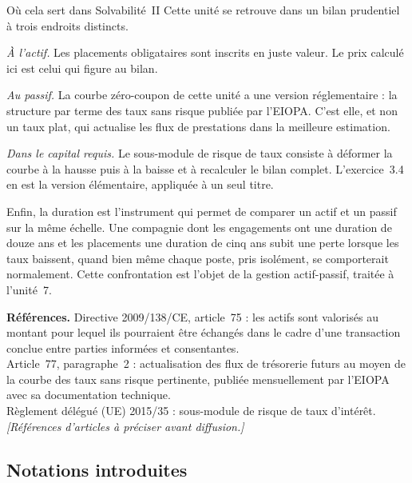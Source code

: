 \begin{pont}{Où cela sert dans Solvabilité~II}
Cette unité se retrouve dans un bilan prudentiel à trois endroits distincts.

\medskip
\emph{À l'actif.} Les placements obligataires sont inscrits en juste valeur.
Le prix calculé ici est celui qui figure au bilan.

\emph{Au passif.} La courbe zéro-coupon de cette unité a une version
réglementaire : la structure par terme des taux sans risque publiée par l'EIOPA.
C'est elle, et non un taux plat, qui actualise les flux de prestations dans la
meilleure estimation.

\emph{Dans le capital requis.} Le sous-module de risque de taux consiste à
déformer la courbe à la hausse puis à la baisse et à recalculer le bilan complet.
L'exercice~3.4 en est la version élémentaire, appliquée à un seul titre.

\medskip
Enfin, la duration est l'instrument qui permet de comparer un actif et un passif
sur la même échelle. Une compagnie dont les engagements ont une duration de
douze ans et les placements une duration de cinq ans subit une perte lorsque les
taux baissent, quand bien même chaque poste, pris isolément, se comporterait
normalement. Cette confrontation est l'objet de la gestion actif-passif, traitée
à l'unité~7.
\end{pont}

\begin{refreg}
\textbf{Références.} Directive 2009/138/CE, article~75 : les actifs sont
valorisés au montant pour lequel ils pourraient être échangés dans le cadre
d'une transaction conclue entre parties informées et consentantes. \\
Article~77, paragraphe~2 : actualisation des flux de trésorerie futurs au moyen
de la courbe des taux sans risque pertinente, publiée mensuellement par l'EIOPA
avec sa documentation technique. \\
Règlement délégué (UE) 2015/35 : sous-module de risque de taux d'intérêt.
\emph{[Références d'articles à préciser avant diffusion.]}
\end{refreg}

\subsection*{Notations introduites}
\begin{description}[leftmargin=3cm, style=nextline, font=\normalfont]
\end{description}
